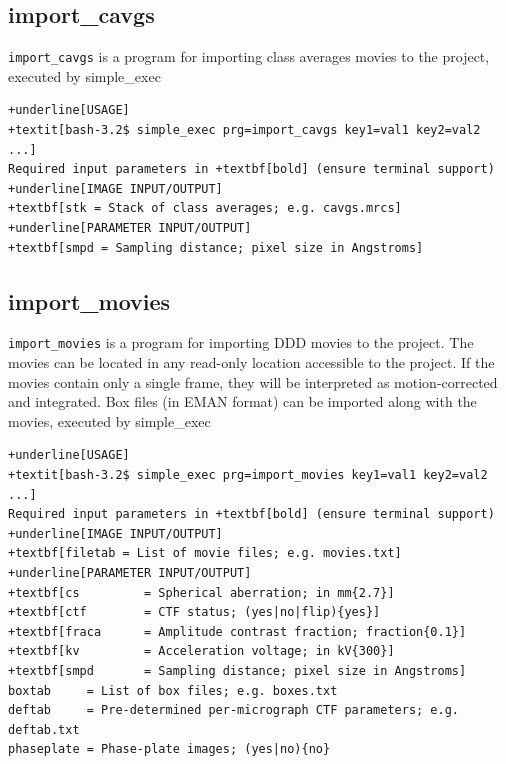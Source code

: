 \documentclass[a4paper,11pt]{article}
\newcommand{\prgname}[1]{\textcolor{NavyBlue}{\texttt{#1}}}
\begin{document}
\subsection{import\_cavgs}
\label{import_cavgs}
\prgname{import\_cavgs} is a program for importing class averages movies to the project, executed by simple\_exec
\begin{Verbatim}[commandchars=+\[\],fontsize=\small,breaklines=true]
+underline[USAGE]
+textit[bash-3.2$ simple_exec prg=import_cavgs key1=val1 key2=val2 ...]
Required input parameters in +textbf[bold] (ensure terminal support)
+underline[IMAGE INPUT/OUTPUT]
+textbf[stk = Stack of class averages; e.g. cavgs.mrcs]
+underline[PARAMETER INPUT/OUTPUT]
+textbf[smpd = Sampling distance; pixel size in Angstroms]
\end{Verbatim}

\subsection{import\_movies}
\label{import_movies}
\prgname{import\_movies} is a program for importing DDD movies to the project. The movies can be located in any read-only location accessible to the project. If the movies contain only a single frame, they will be interpreted as motion-corrected and integrated. Box files (in EMAN format) can be imported along with the movies, executed by simple\_exec
\begin{Verbatim}[commandchars=+\[\],fontsize=\small,breaklines=true]
+underline[USAGE]
+textit[bash-3.2$ simple_exec prg=import_movies key1=val1 key2=val2 ...]
Required input parameters in +textbf[bold] (ensure terminal support)
+underline[IMAGE INPUT/OUTPUT]
+textbf[filetab = List of movie files; e.g. movies.txt]
+underline[PARAMETER INPUT/OUTPUT]
+textbf[cs         = Spherical aberration; in mm{2.7}]
+textbf[ctf        = CTF status; (yes|no|flip){yes}]
+textbf[fraca      = Amplitude contrast fraction; fraction{0.1}]
+textbf[kv         = Acceleration voltage; in kV{300}]
+textbf[smpd       = Sampling distance; pixel size in Angstroms]
boxtab     = List of box files; e.g. boxes.txt
deftab     = Pre-determined per-micrograph CTF parameters; e.g. deftab.txt
phaseplate = Phase-plate images; (yes|no){no}
\end{Verbatim}
\end{document}

